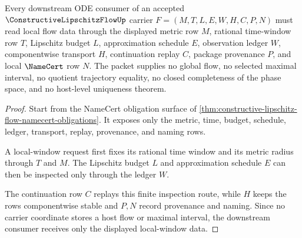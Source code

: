 \begin{theorem}
\label{thm:constructive-lipschitz-flow-local-window-boundary}
Every downstream ODE consumer of an accepted
$\ConstructiveLipschitzFlowUp$ carrier
$F=(M,T,L,E,W,H,C,P,N)$ must read local flow data through the displayed
metric row $M$, rational time-window row $T$, Lipschitz budget $L$,
approximation schedule $E$, observation ledger $W$, componentwise transport
$H$, continuation replay $C$, package provenance $P$, and local $\NameCert$
row $N$. The packet supplies no global flow, no selected maximal interval,
no quotient trajectory equality, no closed completeness of the phase space,
and no host-level uniqueness theorem.
\end{theorem}
\begin{proof}
Start from the NameCert obligation surface of
\autoref{thm:constructive-lipschitz-flow-namecert-obligations}. It exposes
only the metric, time, budget, schedule, ledger, transport, replay,
provenance, and naming rows.

A local-window request first fixes its rational time window and its metric
radius through $T$ and $M$. The Lipschitz budget $L$ and approximation
schedule $E$ can then be inspected only through the ledger $W$.

The continuation row $C$ replays this finite inspection route, while $H$
keeps the rows componentwise stable and $P,N$ record provenance and naming.
Since no carrier coordinate stores a host flow or maximal interval, the
downstream consumer receives only the displayed local-window data.
\end{proof}


\begin{closurestatus}{\ConstructiveLipschitzFlowUp}
  \theoryclosure{\seedClosure}
  \formalstatus{\unformalizedV}
\end{closurestatus}
